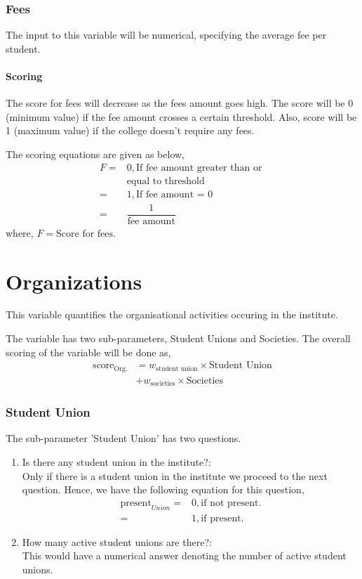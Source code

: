 \documentclass[oneside,twocolumn]{article}
\begin{document}
\subsubsection{Fees}
The input to this variable will be numerical, specifying the
average fee per student.
\paragraph{Scoring}
The score for fees will decrease as the fees amount goes high.
The score will be 0 (minimum value) if the fee amount crosses
a certain threshold. Also, score will be 1 (maximum value) if 
the college doesn't require any fees.

The scoring equations are given as below,
\begin{align*}
  F =& 0, \text{If fee amount greater than or } \\
    &\text{equal to threshold} \\
	  =& 1, \text{If fee amount = 0} \\
	  =& \dfrac{1}{\text{fee amount}}
\end{align*}
where, \(F = \text{Score for fees}\).

\section{Organizations}
This variable quantifies the organisational activities
occuring in the institute.

The variable has two sub-parameters, Student Unions and
Societies. The overall scoring of the variable will be done
as,
\begin{align*}
  \text{score}_{\text{Org.}} &= w_{\text{student union}} \times \text{Student Union} \\
  &+ w_{\text{societies}} \times \text{Societies}
\end{align*}

\subsubsection{Student Union}
The sub-parameter 'Student Union' has two questions.
\begin{enumerate}
\item Is there any student union in the institute?: \\
  Only if there is a student union in the institute we
  proceed to the next question. Hence, we have the
  following equation for this question,
  \begin{align*}
    \text{present}_{Union} =& 0, \text{if not present.} \\
    =& 1, \text{if present.}
  \end{align*}
\item How many active student unions are there?: \\
  This would have a numerical answer denoting the number
  of active student unions.
\end{enumerate}
\end{document}
